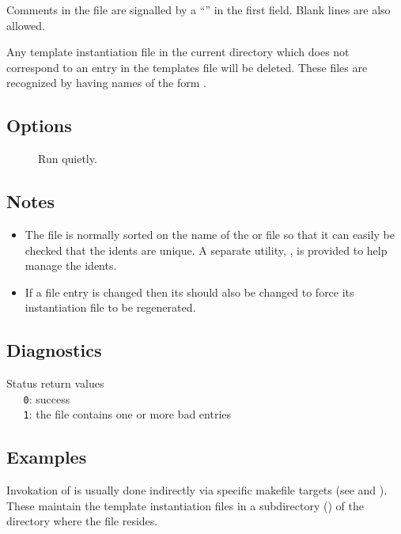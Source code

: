 Comments in the  file are signalled by a ``\code{\#}'' in the
first field.  Blank lines are also allowed.

Any template instantiation  file in the current directory which does
not correspond to an entry in the templates file will be deleted.  These files
are recognized by having names of the form .

\subsection*{Options}
 
\begin{description}
\item[]
   Run quietly.
\end{description}
 
\subsection*{Notes}
 
\begin{itemize}
\item
   The  file is normally sorted on the name of the 
   or  file so that it can easily be checked that the idents are
   unique.  A separate utility, , is provided to help manage
   the idents.
\item
   If a  file entry is changed then its  should
   also be changed to force its instantiation file to be regenerated.
\end{itemize}

\subsection*{Diagnostics}
 
Status return values
\\ \verb+   0+: success
\\ \verb+   1+: the  file contains one or more bad entries
 
\subsection*{Examples}
 
Invokation of  is usually done indirectly via specific makefile
targets (see  and ).  These maintain the template instantiation
files in a subdirectory () of the directory where the
 file resides. 
 
